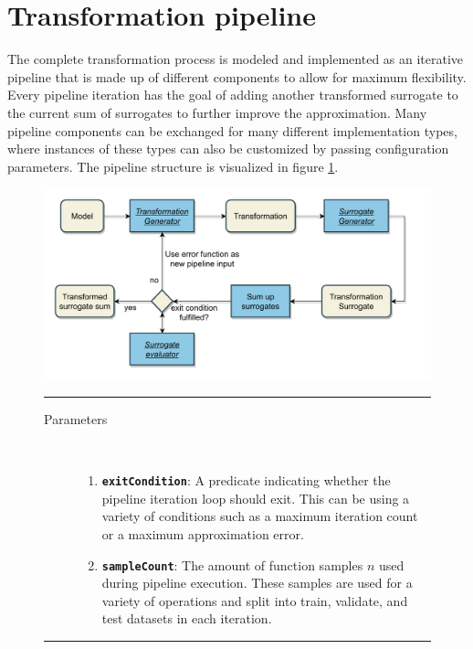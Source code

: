 \documentclass[
  a4paper,  %
  twoside,  %
  bibliography=totoc,
  headsepline,
  cleardoublepage=empty,
  parskip=half,
  draft=false
]{scrbook}
\newcommand{\delimit}{{\color{charcoal}\noindent\rule{\textwidth}{1pt}}}
\begin{document}
\newpage
\section{Transformation pipeline}
\label{sec:tp}

The complete transformation process is modeled and implemented as an iterative pipeline that is made up of different components to allow for maximum flexibility.
Every pipeline iteration has the goal of adding another transformed surrogate to the current sum of surrogates to further improve the approximation.
Many pipeline components can be exchanged for many different implementation types, where instances of these types can also be customized by passing configuration parameters.
The pipeline structure is visualized in figure \ref{fig:tp}.

\begin{mdframed}[style=style,frametitle={Transformation Pipeline}]
\begin{figure}[H]

\includegraphics[width=\textwidth]{graphics/TransformationPipeline.pdf}
\vspace{-7.5mm}

\delimit

\begin{description}
\item[Parameters] {~ \begin{enumerate}[\indent{}]
\item \texttt{\textbf{exitCondition}}: A predicate indicating whether the pipeline iteration loop should exit. This can be using a variety of conditions such as a maximum iteration count or a maximum approximation error.
\item \texttt{\textbf{sampleCount}}: The amount of function samples $n$ used during pipeline execution. These samples are used for a variety of operations and split into train, validate, and test datasets in each iteration.
\end{enumerate}}
\end{description}

\delimit

\label{fig:tp}
\end{figure}
\end{mdframed}
\end{document}
